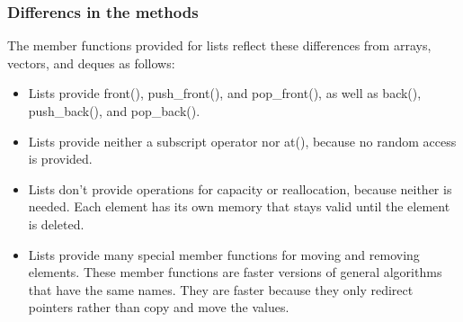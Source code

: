 \documentclass{report}
\begin{document}
\bigbreak \noindent 
\subsubsection{Differencs in the methods}
\bigbreak \noindent 
The member functions provided for lists reflect these differences from arrays, vectors, and deques as follows:
\begin{itemize}
    \item Lists provide front(), push\_front(), and pop\_front(), as well as back(), push\_back(), and pop\_back().
    \item Lists provide neither a subscript operator nor at(), because no random access is provided.
\item Lists don’t provide operations for capacity or reallocation, because neither is needed. Each element has its own memory that stays valid until the element is deleted.
\item Lists provide many special member functions for moving and removing elements. These member functions are faster versions of general algorithms that have the same names. They are faster because they only redirect pointers rather than copy and move the values.
\end{itemize}

\bigbreak \noindent 
\end{document}
